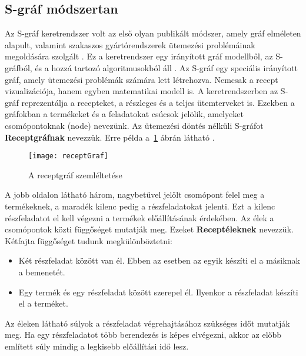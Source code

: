 \subsection{S-gráf módszertan}
Az S-gráf keretrendszer volt az első olyan publikált módszer, amely gráf elméleten alapult, valamint szakaszos gyártórendszerek ütemezési problémáinak megoldására szolgált \cite{combtech}. Ez a keretrendszer egy irányított gráf modellből, az S-gráfból, és a hozzá tartozó algoritmusokból áll \cite{combframe}. Az S-gráf egy speciális irányított gráf, amely ütemezési problémák számára lett létrehozva. Nemcsak a recept vizualizációja, hanem egyben matematikai modell is. A keretrendszerben az S-gráf reprezentálja a recepteket, a részleges és a teljes ütemterveket is. Ezekben a gráfokban a termékeket és a feladatokat csúcsok jelölik, amelyeket csomópontoknak (node) nevezünk. Az ütemezési döntés nélküli S-gráfot \textbf{Receptgráfnak} nevezzük. Erre példa a~\ref{receptGraf} ábrán látható \cite{Hegyhati}. 
\begin{figure}[H]	
\begin{center}
\texttt{[image: receptGraf]}
\caption{A receptgráf szemléltetése}
\label{receptGraf}
\end{center}
\end{figure}
A jobb oldalon látható három, nagybetűvel jelölt csomópont felel meg a termékeknek, a maradék kilenc pedig a részfeladatokat jelenti. Ezt a kilenc részfeladatot el kell végezni a termékek előállításának érdekében. Az élek a csomópontok közti függőséget mutatják meg. Ezeket \textbf{Receptéleknek} nevezzük. Kétfajta függőséget tudunk megkülönböztetni:
\begin{itemize}
  \item Két részfeladat között van él. Ebben az esetben az egyik készíti el a másiknak a bemenetét.
  \item Egy termék és egy részfeladat között szerepel él. Ilyenkor a részfeladat készíti el a terméket.
\end{itemize}
Az éleken látható súlyok a részfeladat végrehajtásához szükséges időt mutatják meg. Ha egy részfeladatot több berendezés is képes elvégezni, akkor az előbb említett súly mindig a legkisebb előállítási idő lesz.


